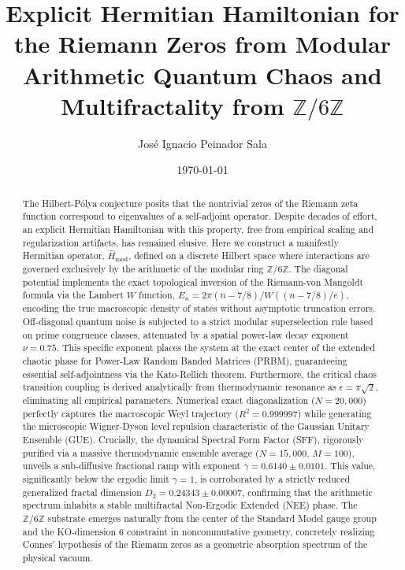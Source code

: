 \documentclass[aps,prl,preprint,superscriptaddress,floatfix]{revtex4-2}
\newcommand{\Zmod}{\mathbb{Z}/6\mathbb{Z}}
\begin{document}
\title{Explicit Hermitian Hamiltonian for the Riemann Zeros from Modular Arithmetic Quantum Chaos and Multifractality from \texorpdfstring{$\Zmod$}{Z/6Z}}

\author{José Ignacio Peinador Sala }

\date{\today}

\begin{abstract}
The Hilbert-P\'olya conjecture posits that the nontrivial zeros of the Riemann zeta function correspond to eigenvalues of a self-adjoint operator. Despite decades of effort, an explicit Hermitian Hamiltonian with this property, free from empirical scaling and regularization artifacts, has remained elusive. Here we construct a manifestly Hermitian operator, $\hat{H}_{\text{mod}}$, defined on a discrete Hilbert space where interactions are governed exclusively by the arithmetic of the modular ring $\mathbb{Z}/6\mathbb{Z}$. The diagonal potential implements the exact topological inversion of the Riemann-von Mangoldt formula via the Lambert $W$ function, $E_n = 2\pi (n - 7/8) / W((n - 7/8)/e)$, encoding the true macroscopic density of states without asymptotic truncation errors. Off-diagonal quantum noise is subjected to a strict modular superselection rule based on prime congruence classes, attenuated by a spatial power-law decay exponent $\nu = 0.75$. This specific exponent places the system at the exact center of the extended chaotic phase for Power-Law Random Banded Matrices (PRBM), guaranteeing essential self-adjointness via the Kato-Rellich theorem. Furthermore, the critical chaos transition coupling is derived analytically from thermodynamic resonance as $\epsilon = \pi \sqrt{2}$, eliminating all empirical parameters. Numerical exact diagonalization ($N=20,000$) perfectly captures the macroscopic Weyl trajectory ($R^2 = 0.999997$) while generating the microscopic Wigner-Dyson level repulsion characteristic of the Gaussian Unitary Ensemble (GUE). Crucially, the dynamical Spectral Form Factor (SFF), rigorously purified via a massive thermodynamic ensemble average ($N=15,000$, $M=100$), unveils a sub-diffusive fractional ramp with exponent $\gamma = 0.6140 \pm 0.0101$. This value, significantly below the ergodic limit $\gamma=1$, is corroborated by a strictly reduced generalized fractal dimension $D_2 = 0.24343 \pm 0.00007$, confirming that the arithmetic spectrum inhabits a stable multifractal Non-Ergodic Extended (NEE) phase. The $\Zmod$ substrate emerges naturally from the center of the Standard Model gauge group and the KO-dimension 6 constraint in noncommutative geometry, concretely realizing Connes' hypothesis of the Riemann zeros as a geometric absorption spectrum of the physical vacuum.
\end{abstract}
\end{document}
